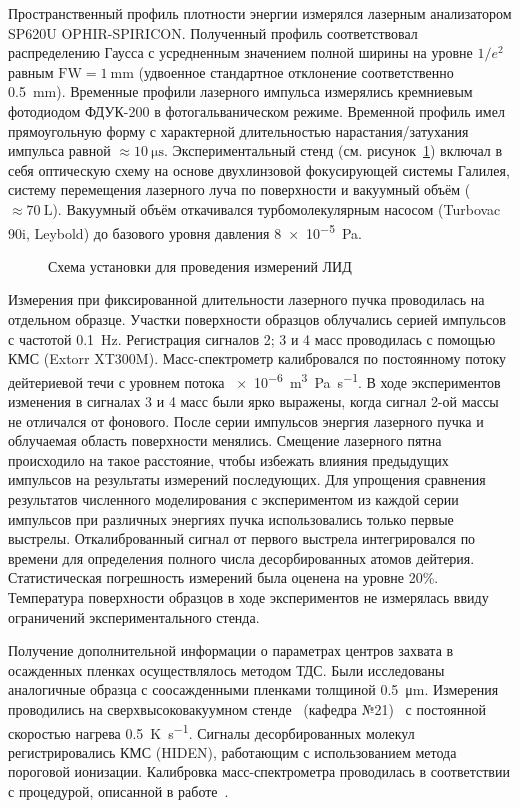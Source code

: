 Пространственный профиль плотности энергии измерялся лазерным анализатором SP620U OPHIR-SPIRICON. Полученный профиль соответствовал распределению Гаусса с усредненным значением полной ширины на уровне $1/e^2$ равным \(\mathrm{FW}=\SI{1}{\milli\metre}\) (удвоенное стандартное отклонение соответственно \SI{0.5}{\milli\meter}). Временные профили лазерного импульса измерялись кремниевым фотодиодом ФДУК-200 в фотогальваническом режиме. Временной профиль имел прямоугольную форму с характерной длительностью нарастания/затухания импульса равной \( \approx \SI{10}{\micro\second} \). Экспериментальный стенд (см. рисунок~\ref{fig:ch4/LID_scheme}) включал в себя оптическую схему на основе двухлинзовой фокусирующей системы Галилея, систему перемещения лазерного луча по поверхности и вакуумный объём ($\approx\SI{70}{\liter}$). Вакуумный объём откачивался турбомолекулярным насосом (Turbovac 90i, Leybold) до базового уровня давления \SI{8e-5}{\pascal}.

\begin{figure}[ht]
    \caption{Схема установки для проведения измерений ЛИД~\cite{Medvedev2024}}\label{fig:ch4/LID_scheme}
\end{figure}

Измерения при фиксированной длительности лазерного пучка проводилась на отдельном образце. Участки поверхности образцов облучались серией импульсов с частотой \SI{0.1}{\hertz}. Регистрация сигналов 2; 3 и 4 масс проводилась с помощью КМС (Extorr XT300M). Масс-спектрометр калибровался по постоянному потоку дейтериевой течи с уровнем потока \SI{e-6}{\metre\cubed\pascal\per\second}. В ходе экспериментов изменения в сигналах 3 и 4 масс были ярко выражены, когда сигнал 2-ой массы не отличался от фонового. После серии импульсов энергия лазерного пучка и облучаемая область поверхности менялись. Смещение лазерного пятна происходило на такое расстояние, чтобы избежать влияния предыдущих импульсов на результаты измерений последующих. Для упрощения сравнения результатов численного моделирования с экспериментом из каждой серии импульсов при различных энергиях пучка использовались только первые выстрелы. Откалиброванный сигнал от первого выстрела интегрировался по времени для определения полного числа десорбированных атомов дейтерия. Статистическая погрешность измерений была оценена на уровне 20\%. Температура поверхности образцов в ходе экспериментов не измерялась ввиду ограничений экспериментального стенда.

Получение дополнительной информации о параметрах центров захвата в осажденных пленках осуществлялось методом ТДС. Были исследованы аналогичные образца с соосажденными пленками толщиной \SI{0.5}{\micro\metre}. Измерения проводились на сверхвысоковакуумном стенде \thesisOrganizationShort \ (кафедра №21)~\cite{Rusinov2009} с постоянной скоростью нагрева \SI{0.5}{\kelvin\per\second}. Сигналы десорбированных молекул регистрировались КМС (HIDEN), работающим с использованием метода пороговой ионизации. Калибровка масс-спектрометра проводилась в соответствии с процедурой, описанной в работе~\cite{Rusinov2009}.

